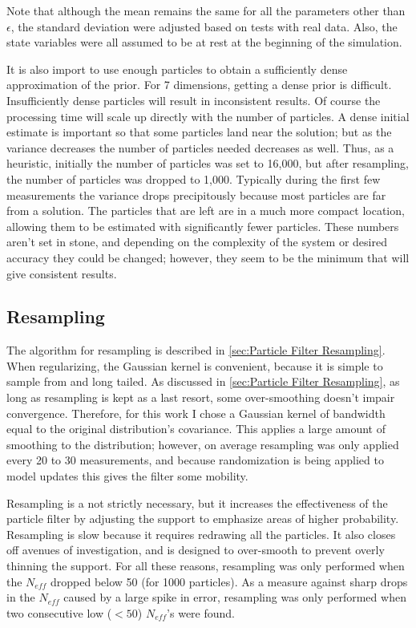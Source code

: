 Note that although the mean remains the same for all the 
parameters other than $\epsilon$, the standard deviation were
adjusted based on tests with real data. Also, the state variables
were all assumed to be at rest at the beginning of the simulation.

It is also import to use enough particles to obtain a 
sufficiently dense approximation of the prior. For 7 dimensions,
getting a dense prior is difficult. Insufficiently
dense particles will result in inconsistent results. Of course the
processing time will scale up directly with the number of particles.
A dense initial estimate is important so that some particles land
near the solution; but as the variance decreases the number of 
particles needed decreases as well. Thus, as a heuristic, initially
the number of particles was set to 16,000, but after resampling,
the number of particles was dropped to 1,000. Typically during the 
first few measurements the variance drops precipitously because
most particles are far from a solution.  The particles that are left are in a
much more compact location, allowing them to be estimated with 
significantly fewer particles. These numbers aren't set in stone,
and depending on the complexity of the system or desired accuracy
they could be changed; however, they seem to be the minimum that
will give consistent results.

\subsection{Resampling}
\label{sec:Resampling}
The algorithm for resampling is described in \autoref{sec:Particle Filter Resampling}.
When regularizing, the Gaussian kernel is convenient,
because it is simple to sample from and long tailed.
As discussed in \autoref{sec:Particle Filter Resampling},
as long as resampling is kept as a last resort, some over-smoothing
doesn't impair convergence. Therefore, for this work I chose a Gaussian kernel of
bandwidth equal to the original distribution's covariance. This 
applies a large amount of smoothing to the distribution; however, on average
resampling was only applied every 20 to 30 measurements, and because randomization
is being applied to model updates this gives the filter some mobility. 

Resampling is a not strictly necessary, but it increases the effectiveness
of the particle filter by adjusting the support to emphasize areas
of higher probability. Resampling is slow because it requires redrawing
all the particles. It also closes off avenues of investigation, and is
designed to over-smooth to prevent overly thinning the support. For all these
reasons, resampling was only performed when the $N_{eff}$ dropped below
50 (for 1000 particles).  As a measure against sharp drops in the $N_{eff}$ 
caused by a large spike in error, resampling was only performed when 
two consecutive low ($<50$) $N_{eff}$'s were found. 

